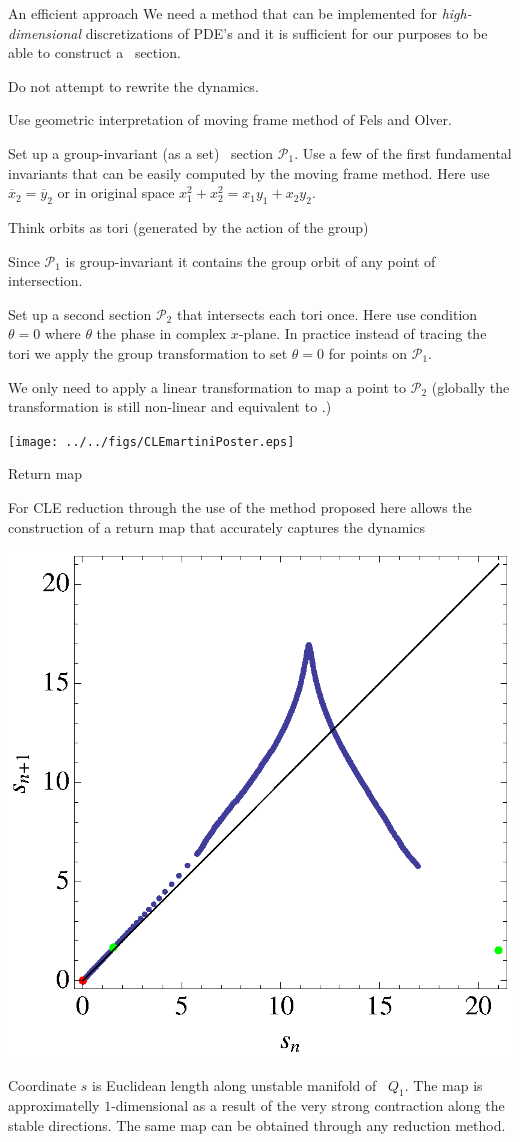 \documentclass{theo1poster}[2003/04/25]
\renewcommand{\labelitemi}{\ding{228}}
\renewenvironment{itemize}%
 {\begin{list}{\labelitemi}%
       {%
        \setlength{\leftmargin}{0pt}%
        \setlength{\itemindent}{0pt}%
        \settowidth{\labelwidth}{\labelitemi}%
        \addtolength{\labelsep}{\itemindent}
        \addtolength{\leftmargin}{\labelwidth}%
        \addtolength{\leftmargin}{\labelsep}%
        \addtolength{\leftmargin}{-\itemindent}%
       }%
 }
 {\end{list}}
\begin{document}
\begin{poster}{4}
\begin{sheet}{An efficient approach}
We need a method that can be implemented for \emph{high-dimensional} discretizations of PDE's
and it is sufficient for our purposes to be able to construct a \Poincare~section.
\begin{itemize}
 \item Do not attempt to rewrite the dynamics.
 \item Use geometric interpretation of moving frame method of Fels and Olver.
 \item Set up a group-invariant (as a set) \Poincare~section $\mathcal{P}_1$. Use
	a few of the first fundamental invariants that can be easily computed by
	the moving frame method. Here use $\overline{x}_2=\overline{y}_2$ or in original
	space $x_1^2+x_2^2=x_1 y_1 + x_2 y_2$.
 \item Think orbits as tori (generated by the action of the group)
 \item Since $\mathcal{P}_1$ is group-invariant it contains the group
	orbit of any point of intersection. 
 \item Set up a second section $\mathcal{P}_2$ that intersects each tori once. 
	Here use condition $\theta=0$ where $\theta$ the phase in complex $x$-plane. In practice instead of tracing the tori we apply the group transformation to set $\theta=0$ for points on $\mathcal{P}_1$.
 \item We only need to apply a linear transformation to map a point to $\mathcal{P}_2$ (globally
	the transformation is still non-linear and equivalent to .)
\end{itemize}

 \begin{center}
 	 	\texttt{[image: ../../figs/CLEmartiniPoster.eps]}
 \end{center} 

\end{sheet}

 
\begin{sheet}{Return map}
 
 For CLE reduction through the use of the method proposed here allows the construction
 of a return map that accurately captures the dynamics
 \begin{center}
 	 	\includegraphics[width=.35\textwidth]{../../figs/CLEinvRM.eps}
 \end{center}
 Coordinate $s$ is Euclidean length along unstable manifold of \reqv~$Q_1$. 
 The map is approximatelly $1$-dimensional as a result of the very strong 
 contraction along the stable directions. The same map can be obtained through
 any reduction method.


\end{sheet}
\end{poster}
\end{document}
